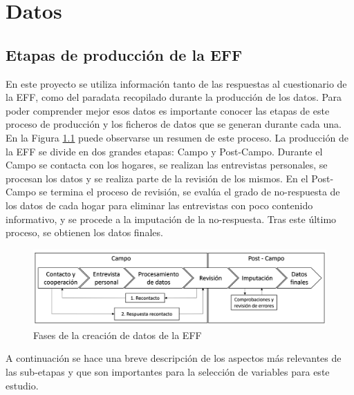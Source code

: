 \chapter{Datos}
\label{chapter:datos}

\section{Etapas de producción de la EFF}
\label{section:etapas_eff}

En este proyecto se utiliza información tanto de las respuestas al cuestionario de la EFF, como del paradata recopilado durante la producción de los datos. Para poder comprender mejor esos datos es importante conocer las etapas de este proceso de producción y los ficheros de datos que se generan durante cada una. En la Figura \ref{fig:eff_phases} puede observarse un resumen de este proceso. La producción de la EFF se divide en dos grandes etapas: Campo y Post-Campo. Durante el Campo se contacta con los hogares, se realizan las entrevistas personales, se procesan los datos y se realiza parte de la revisión de los mismos. En el Post-Campo se termina el proceso de revisión, se evalúa el grado de no-respuesta de los datos de cada hogar para eliminar las entrevistas con poco contenido informativo, y se procede a la imputación de la no-respuesta. Tras este último proceso, se obtienen los datos finales.

\begin{figure}[ht]
	\centering
	\includegraphics[width=1\textwidth]{figs/fases_creacion_datos_eff.png}
	\caption{Fases de la creación de datos de la EFF}
	\label{fig:eff_phases}
\end{figure}

A continuación se hace una breve descripción de los aspectos más relevantes de las sub-etapas y que son importantes para la selección de variables para este estudio.

